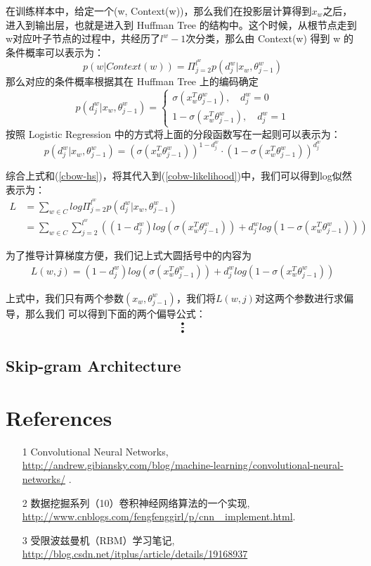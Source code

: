\documentclass[UTF8]{ctexart}
\begin{document}
\par
在训练样本中，给定一个(w, Context(w))，那么我们在投影层计算得到$x_w$之后，进入到输出层，也就是进入到
Huffman Tree 的结构中。这个时候，从根节点走到w对应叶子节点的过程中，共经历了$l^w-1$次分类，那么由
Context(w) 得到 w 的条件概率可以表示为：
\begin{equation}
\label{cbow-hs}
p(w|Context(w)) = \Pi_{j=2}^{l^w} p(d_j^w|x_w, \theta_{j-1}^w)
\end{equation}
那么对应的条件概率根据其在 Huffman Tree 上的编码确定
\begin{equation}
p(d_j^w|x_w, \theta_{j-1}^w)= \begin{cases}
\sigma(x_w^T \theta_{j-1}^w), \quad d_j^w=0
\\
1 - \sigma(x_w^T \theta_{j-1}^w), \quad d_j^w=1
\end{cases}
\end{equation}
按照 Logistic Regression 中的方式将上面的分段函数写在一起则可以表示为：
\[ p(d_j^w|x_w, \theta_{j-1}^w) = (\sigma(x_w^T \theta_{j-1}^w))^{1-d_j^w} \cdot (1-\sigma(x_w^T\theta_{j-1}^w))^{d_j^w} \]
\par
综合上式和(\ref{cbow-hs})，将其代入到(\ref{cobw-likelihood})中，我们可以得到log似然表示为：
\begin{align}
L &= \sum_{w \in C} log \Pi_{j=2}^{l^w}p(d_j^w|x_w, \theta_{j-1}^w)
\\
&= \sum_{w \in C} \sum_{j=2}^{l^w} \left( (1-d_j^w)log(\sigma(x_w^T \theta_{j-1}^w)) + d_j^w log(1-\sigma(x_w^T\theta_{j-1}^w)) \right)
\end{align}
\par
为了推导计算梯度方便，我们记上式大圆括号中的内容为
\begin{align}
L(w, j) = (1-d_j^w)log(\sigma(x_w^T \theta_{j-1}^w)) + d_j^w log(1-\sigma(x_w^T\theta_{j-1}^w))
\end{align}
\par
上式中，我们只有两个参数$(x_w, \theta_{j-1}^w)$，我们将$L(w, j)$对这两个参数进行求偏导，那么我们
可以得到下面的两个偏导公式：
\begin{align}
\frac{•}{•}
\end{align}


\subsection{Skip-gram Architecture}


\section{References}
\begin{itemize}
\item[1] Convolutional Neural Networks, \\
\url{http://andrew.gibiansky.com/blog/machine-learning/convolutional-neural-networks/} .
\item[2] 数据挖掘系列（10）卷积神经网络算法的一个实现, \\
\url{http://www.cnblogs.com/fengfenggirl/p/cnn\_ implement.html}.
\item[3] 受限波兹曼机（RBM）学习笔记, \\
\url{http://blog.csdn.net/itplus/article/details/19168937}
\end{itemize}
\end{document}
